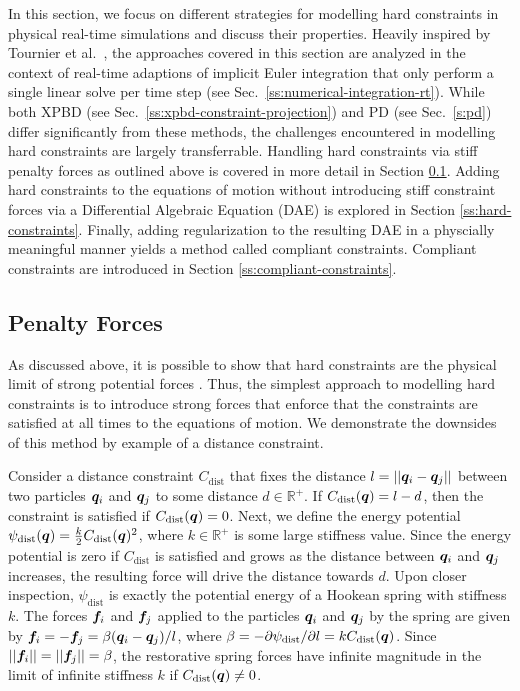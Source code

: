 In this section, we focus on different strategies for modelling hard constraints in physical real-time simulations and discuss 
their properties. Heavily inspired by Tournier et al.\ \cite{tournier2015}, the approaches covered in this section are analyzed 
in the context of real-time adaptions of implicit Euler integration that only perform a single linear solve per time step 
(see Sec.\ \ref{ss:numerical-integration-rt}). While both XPBD (see Sec.\ \ref{ss:xpbd-constraint-projection}) and PD (see Sec.\ \ref{s:pd}) differ 
significantly from these methods, the challenges encountered in modelling hard constraints are largely transferrable. Handling hard constraints 
via stiff penalty forces as outlined above is covered in more detail in Section \ref{ss:penalty-forces}. Adding hard constraints to the equations
of motion without introducing stiff constraint forces via a Differential Algebraic Equation (DAE) is explored in Section \ref{ss:hard-constraints}.
Finally, adding regularization to the resulting DAE in a physcially meaningful manner yields a method called compliant constraints. 
Compliant constraints are introduced in Section \ref{ss:compliant-constraints}.

\subsection{Penalty Forces}\label{ss:penalty-forces}
As discussed above, it is possible to show that hard constraints are the physical limit of strong potential 
forces \cite{servin2006}. Thus, the simplest approach to modelling hard constraints is to introduce strong forces that enforce 
that the constraints are satisfied at all times to the equations of motion. We demonstrate the downsides of this method by 
example of a distance constraint. 

Consider a distance constraint $C_{\text{dist}}$ that 
fixes the distance $l = \vert \vert \bm{q}_i - \bm{q}_j \vert \vert$ between two particles $\bm{q}_i$ and $\bm{q}_j$ to 
some distance $d \in \mathbb{R}^+$. If $C_{\text{dist}}(\bm{q}) = l - d$, then the constraint is satisfied if 
$C_{\text{dist}}(\bm{q}) = 0$. Next, we define the energy potential $\psi_\text{dist}(\bm{q}) = \frac{k}{2}C_\text{dist}(\bm{q})^2$,
where $k \in \mathbb{R}^+$ is some large stiffness value. Since the energy potential is zero if $C_\text{dist}$ is satisfied
and grows as the distance between $\bm{q}_i$ and $\bm{q}_j$ increases, the resulting force will drive the distance towards $d$.
Upon closer inspection, $\psi_\text{dist}$ is exactly the potential energy of a Hookean spring with stiffness $k$. The forces 
$\bm{f}_i$ and $\bm{f}_j$ applied to the particles $\bm{q}_i$ and $\bm{q}_j$ by the spring are given by 
$\bm{f}_i = -\bm{f}_j = \beta (\bm{q}_i - \bm{q}_j) / l$, where $\beta = -\partial\psi_\text{dist}/\partial l = 
kC_\text{dist}(\bm{q})$. Since $\vert \vert \bm{f}_i \vert \vert = \vert \vert \bm{f}_j \vert \vert = \beta$,
the restorative spring forces have infinite magnitude in the limit of infinite stiffness $k$ if $C_\text{dist}(\bm{q}) \neq 0$. 

